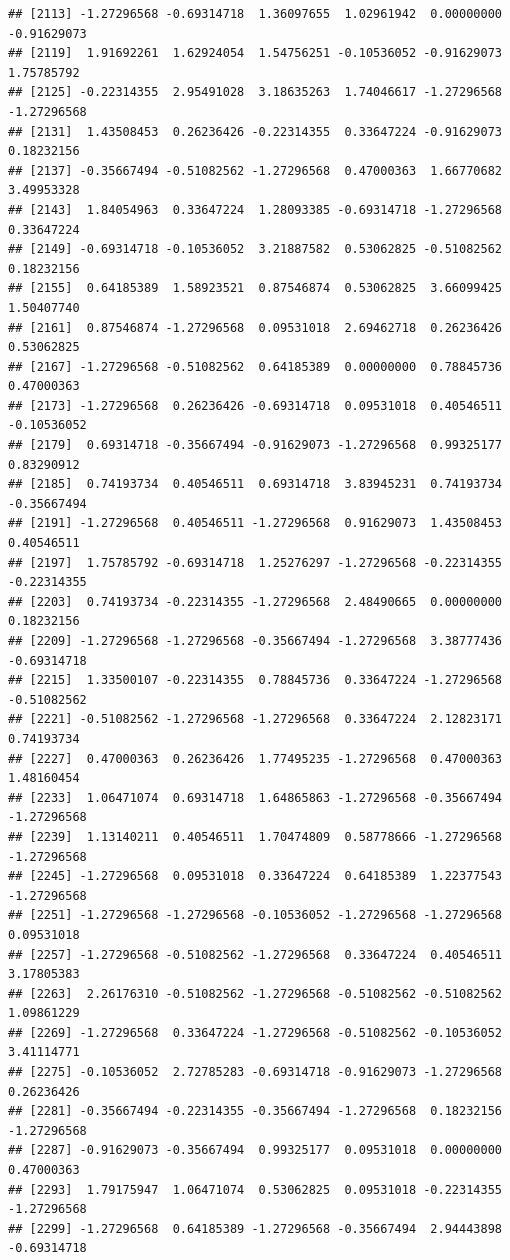 \documentclass[
]{article}
\begin{document}
\begin{verbatim}
## [2113] -1.27296568 -0.69314718  1.36097655  1.02961942  0.00000000 -0.91629073
## [2119]  1.91692261  1.62924054  1.54756251 -0.10536052 -0.91629073  1.75785792
## [2125] -0.22314355  2.95491028  3.18635263  1.74046617 -1.27296568 -1.27296568
## [2131]  1.43508453  0.26236426 -0.22314355  0.33647224 -0.91629073  0.18232156
## [2137] -0.35667494 -0.51082562 -1.27296568  0.47000363  1.66770682  3.49953328
## [2143]  1.84054963  0.33647224  1.28093385 -0.69314718 -1.27296568  0.33647224
## [2149] -0.69314718 -0.10536052  3.21887582  0.53062825 -0.51082562  0.18232156
## [2155]  0.64185389  1.58923521  0.87546874  0.53062825  3.66099425  1.50407740
## [2161]  0.87546874 -1.27296568  0.09531018  2.69462718  0.26236426  0.53062825
## [2167] -1.27296568 -0.51082562  0.64185389  0.00000000  0.78845736  0.47000363
## [2173] -1.27296568  0.26236426 -0.69314718  0.09531018  0.40546511 -0.10536052
## [2179]  0.69314718 -0.35667494 -0.91629073 -1.27296568  0.99325177  0.83290912
## [2185]  0.74193734  0.40546511  0.69314718  3.83945231  0.74193734 -0.35667494
## [2191] -1.27296568  0.40546511 -1.27296568  0.91629073  1.43508453  0.40546511
## [2197]  1.75785792 -0.69314718  1.25276297 -1.27296568 -0.22314355 -0.22314355
## [2203]  0.74193734 -0.22314355 -1.27296568  2.48490665  0.00000000  0.18232156
## [2209] -1.27296568 -1.27296568 -0.35667494 -1.27296568  3.38777436 -0.69314718
## [2215]  1.33500107 -0.22314355  0.78845736  0.33647224 -1.27296568 -0.51082562
## [2221] -0.51082562 -1.27296568 -1.27296568  0.33647224  2.12823171  0.74193734
## [2227]  0.47000363  0.26236426  1.77495235 -1.27296568  0.47000363  1.48160454
## [2233]  1.06471074  0.69314718  1.64865863 -1.27296568 -0.35667494 -1.27296568
## [2239]  1.13140211  0.40546511  1.70474809  0.58778666 -1.27296568 -1.27296568
## [2245] -1.27296568  0.09531018  0.33647224  0.64185389  1.22377543 -1.27296568
## [2251] -1.27296568 -1.27296568 -0.10536052 -1.27296568 -1.27296568  0.09531018
## [2257] -1.27296568 -0.51082562 -1.27296568  0.33647224  0.40546511  3.17805383
## [2263]  2.26176310 -0.51082562 -1.27296568 -0.51082562 -0.51082562  1.09861229
## [2269] -1.27296568  0.33647224 -1.27296568 -0.51082562 -0.10536052  3.41114771
## [2275] -0.10536052  2.72785283 -0.69314718 -0.91629073 -1.27296568  0.26236426
## [2281] -0.35667494 -0.22314355 -0.35667494 -1.27296568  0.18232156 -1.27296568
## [2287] -0.91629073 -0.35667494  0.99325177  0.09531018  0.00000000  0.47000363
## [2293]  1.79175947  1.06471074  0.53062825  0.09531018 -0.22314355 -1.27296568
## [2299] -1.27296568  0.64185389 -1.27296568 -0.35667494  2.94443898 -0.69314718

\end{verbatim}
\end{document}

